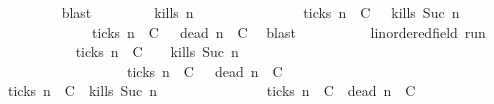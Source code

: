 \begin{isabellebody}
\ \ \ \ \ \ \ \ \isamarkupfalse%
\ blast\isanewline
\ \ \ \ \isacommand{{\isacharbraceright}}\isamarkupfalse%
\ \isamarkupfalse%
\ {\isacartoucheopen}{\isacharbraceleft}{\isasymrho}{\isachardot}\ {\isacharquery}kills\ n\ {\isasymrho}{\isacharbraceright}\isanewline
\ \ \ \ \ \ \ \ \ \ \ {\isasymsubseteq}\ {\isacharbraceleft}{\isasymrho}{\isachardot}\ {\isasymnot}\ {\isacharquery}ticks\ n\ {\isasymrho}\ C\ {\isasyminter}\ {\isacharbraceleft}{\isasymrho}{\isachardot}\ {\isacharquery}kills\ {\isacharparenleft}Suc\ n{\isacharparenright}\ {\isasymrho}{\isacharbraceright}\ \isanewline
\ \ \ \ \ \ \ \ \ \ \ \ {\isasymunion}\ {\isacharbraceleft}{\isasymrho}{\isachardot}\ {\isacharquery}ticks\ n\ {\isasymrho}\ C\ {\isasyminter}\ {\isacharbraceleft}{\isasymrho}{\isachardot}\ {\isacharquery}dead\ n\ {\isasymrho}\ C\ \isamarkupfalse%
\ blast\isanewline
\ \ \isamarkupfalse%
\isanewline
\ \ \ \ \isacommand{{\isacharbraceleft}}\isamarkupfalse%
\ \isamarkupfalse%
\ {\isasymrho}{\isacharcolon}{\isacharcolon}{\isacartoucheopen}{\isacharprime}{\isasymtau}{\isacharcolon}{\isacharcolon}linordered{\isacharunderscore}field\ run{\isacartoucheclose}\isanewline
\ \ \ \ \ \ \isamarkupfalse%
\ {\isacartoucheopen}{\isasymrho}\ {\isasymin}\ {\isacharparenleft}{\isacharbraceleft}{\isasymrho}{\isachardot}\ {\isasymnot}\ {\isacharquery}ticks\ n\ {\isasymrho}\ C\ \ {\isasyminter}\ {\isacharbraceleft}{\isasymrho}{\isachardot}\ {\isacharquery}kills\ {\isacharparenleft}Suc\ n{\isacharparenright}\ {\isasymrho}{\isacharbraceright}{\isacharparenright}\isanewline
\ \ \ \ \ \ \ \ \ \ \ \ \ \ \ \ \ {\isasymunion}\ {\isacharparenleft}{\isacharbraceleft}{\isasymrho}{\isachardot}\ {\isacharquery}ticks\ n\ {\isasymrho}\ C\ {\isasyminter}\ {\isacharbraceleft}{\isasymrho}{\isachardot}\ {\isacharquery}dead\ n\ {\isasymrho}\ C\isanewline
\ \ \ \ \ \ \isamarkupfalse%
\ {\isacartoucheopen}{\isasymnot}\ {\isacharquery}ticks\ n\ {\isasymrho}\ C\ {\isasymand}\ {\isacharquery}kills\ {\isacharparenleft}Suc\ n{\isacharparenright}\ {\isasymrho}\isanewline
\ \ \ \ \ \ \ \ \ \ \ \ \ {\isasymor}\ {\isacharquery}ticks\ n\ {\isasymrho}\ C\ {\isasymand}\ {\isacharquery}dead\ n\ {\isasymrho}\ C\ \isamarkupfalse%

\end{isabellebody}
